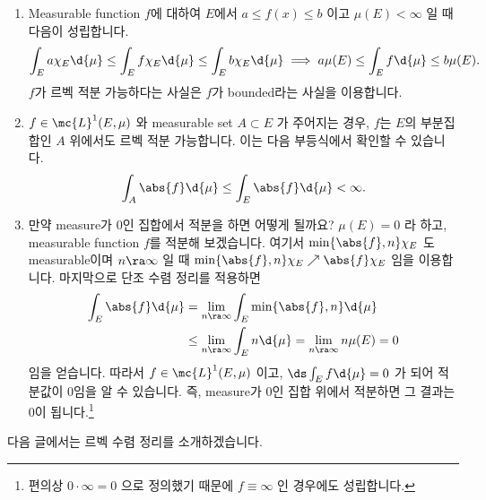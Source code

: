 \begin{enumerate}
    \item Measurable function \(f\)에 대하여 \(E\)에서 \(a \leq f(x) \leq b\) 이고 \(\mu(E) < \infty\) 일 때 다음이 성립합니다.
          \[
              \int_E a \chi_E \d{\mu} \leq \int_E f\chi_E \d{\mu} \leq \int_E b \chi_E \d{\mu} \implies a \mu(E) \leq \int_E f \d{\mu} \leq b \mu(E).
          \]
          \(f\)가 르벡 적분 가능하다는 사실은 \(f\)가 bounded라는 사실을 이용합니다.

    \item \(f \in \mc{L}^{1}(E, \mu)\) 와 measurable set \(A \subset E\) 가 주어지는 경우, \(f\)는 \(E\)의 부분집합인 \(A\) 위에서도 르벡 적분 가능합니다. 이는 다음 부등식에서 확인할 수 있습니다.
          \[
              \int_A \abs{f} \d{\mu} \leq \int_E \abs{f}\d{\mu} < \infty.
          \]

    \item 만약 measure가 0인 집합에서 적분을 하면 어떻게 될까요? \(\mu(E) = 0\) 라 하고, measurable function \(f\)를 적분해 보겠습니다. 여기서 \(\min\{\abs{f}, n\}\chi_E\) 도 measurable이며 \(n \ra \infty\) 일 때 \(\min\{\abs{f}, n\}\chi_E \nearrow \abs{f}\chi_E\) 임을 이용합니다. 마지막으로 단조 수렴 정리를 적용하면
          \[
              \begin{aligned}
                \int_E \abs{f} \d{\mu} &= \lim_{n \ra \infty} \int_E \min\{\abs{f}, n\} \d{\mu} \\
                &\leq \lim_{n \ra \infty} \int_E n \d{\mu} = \lim_{n \ra \infty} n\mu(E) = 0
              \end{aligned}
          \]
          임을 얻습니다. 따라서 \(f \in \mc{L}^{1}(E, \mu)\) 이고, \(\ds \int_E f \d{\mu} = 0\) 가 되어 적분값이 0임을 알 수 있습니다. 즉, measure가 0인 집합 위에서 적분하면 그 결과는 0이 됩니다.\footnote{편의상 \(0\cdot\infty = 0\) 으로 정의했기 때문에 \(f \equiv \infty\) 인 경우에도 성립합니다.}
\end{enumerate}

다음 글에서는 르벡 수렴 정리를 소개하겠습니다.

\pagebreak
